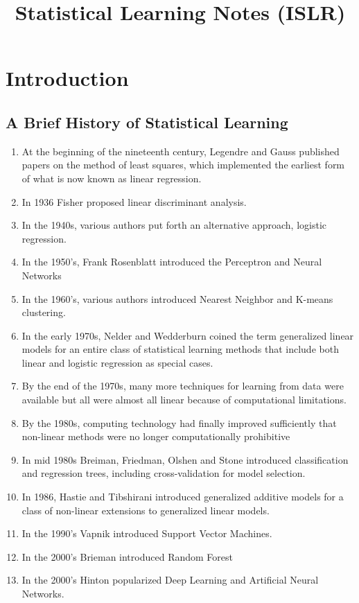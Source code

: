 \documentclass{article}
\title{\vspace{-3cm} Statistical Learning Notes (ISLR)}
\author{}
\date{}
\begin{document}
\maketitle
\vspace{-1.5cm}

\tableofcontents
\newpage

\section{Introduction}
\subsection{A Brief History of Statistical Learning}
    \begin{enumerate}
        \item  At the beginning of the nineteenth century, Legendre and Gauss published papers on the method of least squares, which implemented the earliest form of what is now known as linear regression.
        \item In 1936 Fisher proposed linear discriminant analysis.
        \item In the 1940s, various authors put forth an alternative approach, logistic regression.
        \item In the 1950's, Frank Rosenblatt introduced the Perceptron and Neural Networks
        \item In the 1960's, various authors introduced Nearest Neighbor and K-means clustering.
        \item In the early 1970s, Nelder and Wedderburn coined the term generalized linear models for an entire class of statistical learning methods that include both linear and logistic regression as special cases.
        \item By the end of the 1970s, many more techniques for learning from data were available but all were almost all linear because of computational limitations.
        \item By the 1980s, computing technology had finally improved sufficiently that non-linear methods were no longer computationally prohibitive
        \item In mid 1980s Breiman, Friedman, Olshen and Stone introduced classification and regression trees,  including cross-validation for model selection.
        \item In 1986,  Hastie and Tibshirani introduced generalized additive models for a class of non-linear extensions to generalized linear models.
        \item In the 1990's Vapnik introduced Support Vector Machines.
        \item In the 2000's Brieman introduced Random Forest
        \item In the 2000's Hinton popularized Deep Learning and Artificial Neural Networks. 
    \end{enumerate}
\end{document}
